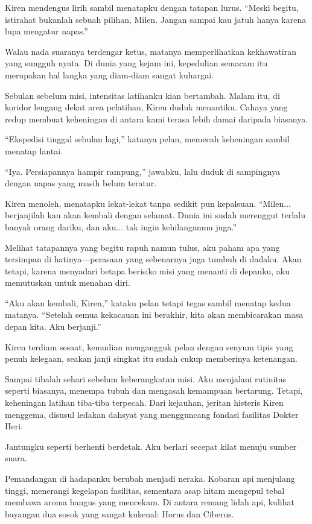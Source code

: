 Kiren mendengus lirih sambil menatapku dengan tatapan lurus. ``Meski begitu, istirahat bukanlah sebuah pilihan, Milen. Jangan sampai kau jatuh hanya karena lupa mengatur napas.''

Walau nada suaranya terdengar ketus, matanya memperlihatkan kekhawatiran yang sungguh nyata. Di dunia yang kejam ini, kepedulian semacam itu merupakan hal langka yang diam-diam sangat kuhargai.

Sebulan sebelum misi, intensitas latihanku kian bertambah. Malam itu, di koridor lengang dekat area pelatihan, Kiren duduk menantiku. Cahaya yang redup membuat keheningan di antara kami terasa lebih damai daripada biasanya.

``Ekspedisi tinggal sebulan lagi,'' katanya pelan, memecah keheningan sambil menatap lantai.

``Iya. Persiapannya hampir rampung,'' jawabku, lalu duduk di sampingnya dengan napas yang masih belum teratur.

Kiren menoleh, menatapku lekat-lekat tanpa sedikit pun kepalsuan. ``Milen$\dots$ berjanjilah kau akan kembali dengan selamat. Dunia ini sudah merenggut terlalu banyak orang dariku, dan aku$\dots$ tak ingin kehilanganmu juga.''

Melihat tatapannya yang begitu rapuh namun tulus, aku paham apa yang tersimpan di hatinya—perasaan yang sebenarnya juga tumbuh di dadaku. Akan tetapi, karena menyadari betapa berisiko misi yang menanti di depanku, aku memutuskan untuk menahan diri.

``Aku akan kembali, Kiren,'' kataku pelan tetapi tegas sambil menatap kedua matanya. ``Setelah semua kekacauan ini berakhir, kita akan membicarakan masa depan kita. Aku berjanji.''

Kiren terdiam sesaat, kemudian mengangguk pelan dengan senyum tipis yang penuh kelegaan, seakan janji singkat itu sudah cukup memberinya ketenangan.

Sampai tibalah sehari sebelum keberangkatan misi. Aku menjalani rutinitas seperti biasanya, menempa tubuh dan mengasah kemampuan bertarung. Tetapi, keheningan latihan tiba-tiba terpecah. Dari kejauhan, jeritan histeris Kiren menggema, disusul ledakan dahsyat yang mengguncang fondasi fasilitas Dokter Heri.

Jantungku seperti berhenti berdetak. Aku berlari secepat kilat menuju sumber suara.

Pemandangan di hadapanku berubah menjadi neraka. Kobaran api menjulang tinggi, menerangi kegelapan fasilitas, sementara asap hitam mengepul tebal membawa aroma hangus yang mencekam. Di antara remang lidah api, kulihat bayangan dua sosok yang sangat kukenal: Horus dan Ciberus.

